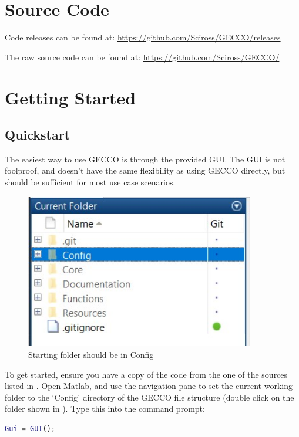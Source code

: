 \documentclass[12pt,twoside,onecolumn,a4paper]{article}
\begin{document}
\section{Source Code}
Code releases can be found at: \href{https://github.com/Sciross/GECCO/releases}{https://github.com/Sciross/GECCO/releases}

The raw source code can be found at: \href{https://github.com/Sciross/GECCO/}{https://github.com/Sciross/GECCO/}

\section{Getting Started}
\subsection{Quickstart}
The easiest way to use GECCO is through the provided GUI. The GUI is not foolproof, and doesn't have the same flexibility as using GECCO directly, but should be sufficient for most use case scenarios.


\begin{figure}[H]
\centering
\includegraphics[width=10cm]{./Figures/Folder_Navigation.jpg}
\caption{Starting folder should be in Config}
\end{figure}

To get started, ensure you have a copy of the code from the one of the sources listed in . Open Matlab, and use the navigation pane to set the current working folder to the `Config' directory of the GECCO file structure (double click on the folder shown in ). Type this into the command prompt:
\begin{lstlisting}[language=Matlab]
Gui = GUI();
\end{lstlisting}
\end{document}
